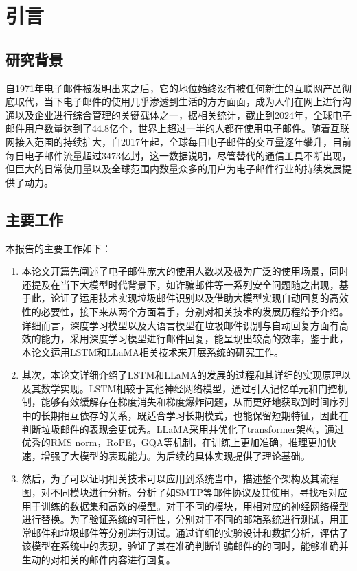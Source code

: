 \documentclass[12pt, a4paper]{article}
\begin{document}
\section{引言}
\subsection{研究背景}
自1971年电子邮件被发明出来之后，它的地位始终没有被任何新生的互联网产品彻底取代，当下电子邮件的使用几乎渗透到生活的方方面面，成为人们在网上进行沟通以及企业进行综合管理的关键载体之一，据相关统计，截止到2024年，全球电子邮件用户数量达到了44.8亿个，世界上超过一半的人都在使用电子邮件。随着互联网接入范围的持续扩大，自2017年起，全球每日电子邮件的交互量逐年攀升，目前每日电子邮件流量超过3473亿封，这一数据说明，尽管替代的通信工具不断出现，但巨大的日常使用量以及全球范围内数量众多的用户为电子邮件行业的持续发展提供了动力。

\subsection{主要工作}
本报告的主要工作如下：
\begin{enumerate}
    \item 本论文开篇先阐述了电子邮件庞大的使用人数以及极为广泛的使用场景，同时还提及在当下大模型时代背景下，如诈骗邮件等一系列安全问题随之出现，基于此，论证了运用技术实现垃圾邮件识别以及借助大模型实现自动回复的高效性的必要性，接下来从两个方面着手，分别对相关技术的发展历程给予介绍。详细而言，深度学习模型以及大语言模型在垃圾邮件识别与自动回复方面有高效的能力，采用深度学习模型进行邮件回复，能呈现出较高的效率，鉴于此，本论文运用LSTM和LLaMA相关技术来开展系统的研究工作。
    \item 其次，本论文详细介绍了LSTM和LLaMA的发展的过程和其详细的实现原理以及其数学实现。LSTM相较于其他神经网络模型，通过引入记忆单元和门控机制，能够有效缓解存在梯度消失和梯度爆炸问题，从而更好地获取到时间序列中的长期相互依存的关系，既适合学习长期模式，也能保留短期特征，因此在判断垃圾邮件的表现会更优秀。LLaMA采用并优化了transformer架构，通过优秀的RMS norm，RoPE，GQA等机制，在训练上更加准确，推理更加快速，增强了大模型的表现能力。为后续的具体实现提供了理论基础。
    \item 然后，为了可以证明相关技术可以应用到系统当中，描述整个架构及其流程图，对不同模块进行分析。分析了如SMTP等邮件协议及其使用，寻找相对应用于训练的数据集和高效的模型。对于不同的模块，用相对应的神经网络模型进行替换。为了验证系统的可行性，分别对于不同的邮箱系统进行测试，用正常邮件和垃圾邮件等分别进行测试。通过详细的实验设计和数据分析，评估了该模型在系统中的表现，验证了其在准确判断诈骗邮件的的同时，能够准确并生动的对相关的邮件内容进行回复。
\end{enumerate}
\end{document}
